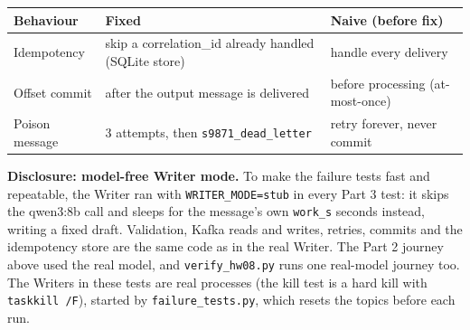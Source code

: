 \documentclass[11pt]{article}
\begin{document}
\begin{center}
{\small
\begin{tabular}{p{1.1in}p{2.8in}p{2.3in}}
\toprule
\textbf{Behaviour} & \textbf{Fixed} & \textbf{Naive (before fix)} \\
\midrule
Idempotency & skip a correlation\_id already handled (SQLite store) & handle every delivery \\
Offset commit & after the output message is delivered & before processing (at-most-once) \\
Poison message & 3 attempts, then \texttt{s9871\_\allowbreak{}dead\_\allowbreak{}letter} & retry forever, never commit \\
\bottomrule
\end{tabular}}
\end{center}
\textbf{Disclosure: model-free Writer mode.} To make the failure tests fast and repeatable, the Writer ran with \texttt{WRITER\_\allowbreak{}MODE=stub} in every Part 3 test: it skips the qwen3:8b call and sleeps for the message's own \texttt{work\_\allowbreak{}s} seconds instead, writing a fixed draft. Validation, Kafka reads and writes, retries, commits and the idempotency store are the same code as in the real Writer. The Part 2 journey above used the real model, and \texttt{verify\_\allowbreak{}hw08.py} runs one real-model journey too. The Writers in these tests are real processes (the kill test is a hard kill with \texttt{taskkill /\allowbreak{}F}), started by \texttt{failure\_\allowbreak{}tests.py}, which resets the topics before each run.
\end{document}
